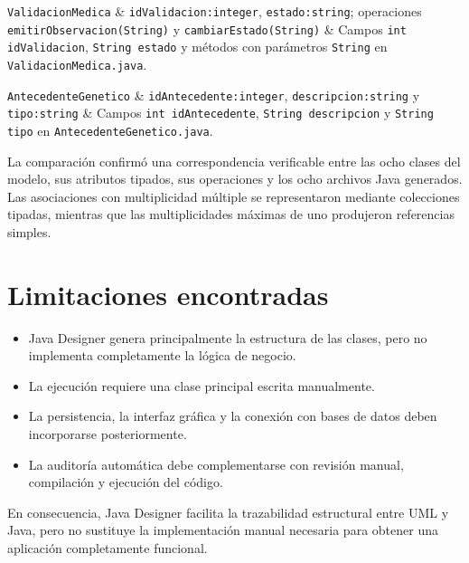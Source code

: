 \documentclass[10pt,a4paper,openany]{report}
\begin{document}
\begin{table}[H]
\begin{tabularx}{\textwidth}
			\texttt{ValidacionMedica} &
			\texttt{idValidacion:integer},
			\texttt{estado:string};
			operaciones \texttt{emitirObservacion(String)} y
			\texttt{cambiarEstado(String)} &
			Campos \texttt{int idValidacion},
			\texttt{String estado} y métodos con parámetros
			\texttt{String}
			en \texttt{ValidacionMedica.java}. \\
			\hline
			
			\texttt{AntecedenteGenetico} &
			\texttt{idAntecedente:integer},
			\texttt{descripcion:string} y
			\texttt{tipo:string} &
			Campos \texttt{int idAntecedente},
			\texttt{String descripcion} y
			\texttt{String tipo}
			en \texttt{AntecedenteGenetico.java}. \\
			\hline
		\end{tabularx}
	\end{table}
	
	La comparación confirmó una correspondencia verificable entre las
	ocho clases del modelo, sus atributos tipados, sus operaciones y los
	ocho archivos Java generados. Las asociaciones con multiplicidad
	múltiple se representaron mediante colecciones tipadas, mientras que
	las multiplicidades máximas de uno produjeron referencias simples.
	
	\section{Limitaciones encontradas}
	
	\begin{itemize}
		\setlength{\itemsep}{1pt}
		
		\item Java Designer genera principalmente la estructura de las clases,
		pero no implementa completamente la lógica de negocio.
		
		\item La ejecución requiere una clase principal escrita manualmente.
		
		\item La persistencia, la interfaz gráfica y la conexión con bases de
		datos deben incorporarse posteriormente.
		
		\item La auditoría automática debe complementarse con revisión manual,
		compilación y ejecución del código.
		
	\end{itemize}
	
	En consecuencia, Java Designer facilita la trazabilidad estructural
	entre UML y Java, pero no sustituye la implementación manual necesaria
	para obtener una aplicación completamente funcional.
	
\end{document}
